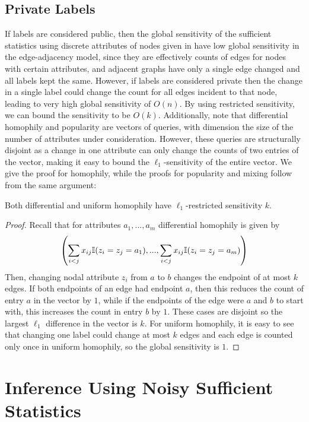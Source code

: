 \subsection{Private Labels}

If labels are considered public, then the global sensitivity of the sufficient statistics using discrete attributes of nodes given in  have low global sensitivity in the edge-adjacency model, since they are effectively counts of edges for nodes with certain attributes, and adjacent graphs have only a single edge changed and all labels kept the same. However, if labels are considered private then the change in a single label could change the count for all edges incident to that node, leading to very high global sensitivity of $O(n)$. By using restricted sensitivity, we can bound the sensitivity to be $O(k)$. Additionally, note that differential homophily and popularity are vectors of queries, with dimension the size of the number of attributes under consideration. However, these queries are structurally disjoint as a change in one attribute can only change the counts of two entries of the vector, making it easy to bound the $\ell_1$-sensitivity of the entire vector. We give the proof for homophily, while the proofs for popularity and mixing follow from the same argument:

\begin{claim}
	Both differential and uniform homophily have $\ell_1$-restricted sensitivity $k$.
\end{claim}
\begin{proof}
Recall that for attributes $a_1,...,a_m$ differential homophily is given by  
$$\left(\sum\limits_{i < j} x_{ij} \mathbb{I} (z_i = z_j = a_1),..., \sum\limits_{i < j} x_{ij} \mathbb{I} (z_i = z_j = a_m)\right)$$
 Then, changing nodal attribute $z_i$ from $a$ to $b$ changes the endpoint of at most $k$ edges. If both endpoints of an edge had endpoint $a$, then this reduces the count of entry $a$ in the vector by $1$, while if the endpoints of the edge were $a$ and $b$ to start with, this increases the count in entry $b$ by $1$. These cases are disjoint so the largest $\ell_1$ difference in the vector is $k$.  For uniform homophily, it is easy to see that changing one label could change at most $k$ edges and each edge is counted only once in uniform homophily, so the global sensitivity is $1$.
\end{proof}

\section{Inference Using Noisy Sufficient Statistics}\label{sec:inf_summary}

